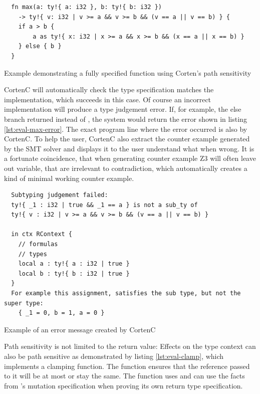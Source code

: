 \documentclass[twoside, english]{sdqthesis}
\theoremstyle{definition}
\begin{document}
\begin{listing}[h]
  \begin{verbatim}
  fn max(a: ty!{ a: i32 }, b: ty!{ b: i32 }) 
    -> ty!{ v: i32 | v >= a && v >= b && (v == a || v == b) } {
    if a > b {
        a as ty!{ x: i32 | x >= a && x >= b && (x == a || x == b) }
    } else { b }
  }
  \end{verbatim}
  \caption{Example demonstrating a fully specified  function using Corten's path sensitivity}
  \label{lst:eval-max}
\end{listing}

CortenC will automatically check the type specification matches the implementation, which succeeds in this case.
Of course an incorrect implementation will produce a type judgement error. If, for example, the else branch returned  instead of , the system would return the error shown in listing \ref{lst:eval-max-error}. The exact program line where the error occurred is also by CortenC. To help the user, CortenC also extract the counter example generated by the SMT solver and displays it to the user understand what when wrong. It is a fortunate coincidence, that when generating counter example Z3 will often leave out variable, that are irrelevant to contradiction, which automatically creates a kind of minimal working counter example.

\begin{listing}[h]
  \begin{verbatim}
  Subtyping judgement failed: 
  ty!{ _1 : i32 | true && _1 == a } is not a sub_ty of 
  ty!{ v : i32 | v >= a && v >= b && (v == a || v == b) } 

  in ctx RContext {
    // formulas
    // types
    local a : ty!{ a : i32 | true }
    local b : ty!{ b : i32 | true }
  }
  For example this assignment, satisfies the sub type, but not the super type:
    { _1 = 0, b = 1, a = 0 }
  \end{verbatim}
  \caption{Example of an error message created by CortenC}
  \label{lst:eval-max-error}
\end{listing}

Path sensitivity is not limited to the return value: Effects on the type context can also be path sensitive as demonstrated by listing \ref{lst:eval-clamp}, which implements a clamping function. The function  ensures that the reference passed to it will be at most  or stay the same. The  function uses  and can use the facts from 's mutation specification when proving its own return type specification.
\end{document}
